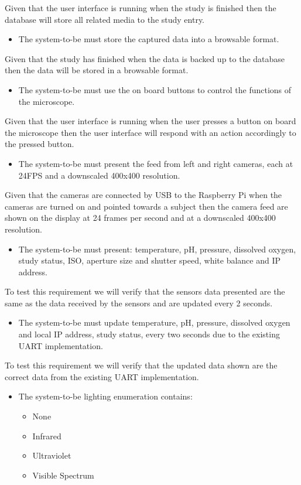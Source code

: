 Given that the user interface is running when the study is finished then the database will store all related media to the study entry.
\begin{itemize}
    \item The system-to-be must store the captured data into a browsable format.
\end{itemize}
Given that the study has finished when the data is backed up to the database then the data will be stored in a browsable format.
\begin{itemize}
    \item The system-to-be must use the on board buttons to control the functions of the microscope.
\end{itemize}
Given that the user interface is running when the user presses a button on board the microscope then the user interface will respond with an action accordingly to the pressed button.
\begin{itemize}
   \item The system-to-be must present the feed from left and right cameras, each at 24FPS and a downscaled 400x400 resolution.
\end{itemize}
Given that the cameras are connected by USB to the Raspberry Pi when the cameras are turned on and pointed towards a subject then the camera feed are shown on the display at 24 frames per second and at a downscaled 400x400 resolution.
\begin{itemize}
    \item The system-to-be must present: temperature, pH, pressure, dissolved oxygen, study status, ISO, aperture size and shutter speed, white balance and IP address.
\end{itemize}
To test this requirement we will verify that the sensors data presented are the same as the data received by the sensors and are updated every 2 seconds.
\begin{itemize}
    \item The system-to-be must update temperature, pH, pressure, dissolved oxygen and local IP address, study status, every two seconds due to the existing UART implementation.
\end{itemize}
To test this requirement we will verify that the updated data shown are the correct data from the existing UART implementation.
\begin{itemize}
    \item The system-to-be lighting enumeration contains:
    \begin{itemize}
        \item None
        \item Infrared
        \item Ultraviolet
        \item Visible Spectrum
    \end{itemize}
\end{itemize}
